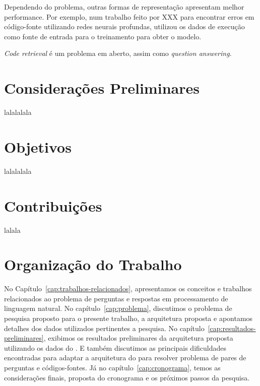 Dependendo do problema, outras formas de representação apresentam melhor performance. Por exemplo, num trabalho feito por XXX para encontrar erros em código-fonte utilizando redes neurais profundas, utilizou os dados de execução como fonte de entrada para o treinamento para obter o modelo. 

\textit{Code retrieval} é um problema em aberto, assim como \textit{question answering}. 














\section{Considerações Preliminares}
\label{sec:consideracoes_preliminares}

lalalalala


\section{Objetivos}
\label{sec:objetivo}

lalalalala

\section{Contribuições}
\label{sec:contribucoes}

lalala

\section{Organização do Trabalho}
\label{sec:organizacao_trabalho}

No Capítulo~\ref{cap:trabalhos-relacionados}, apresentamos os conceitos e trabalhos relacionados ao problema de perguntas e respostas em processamento de linguagem natural. No capítulo~\ref{cap:problema}, discutimos o problema de pesquisa proposto para o presente trabalho, a arquitetura proposta e apontamos detalhes dos dados utilizados pertinentes a pesquisa. 
No capítulo~\ref{cap:resultados-preliminares}, exibimos os resultados preliminares da arquitetura proposta utilizando os dados do \cite{yao-2018}. E também discutimos as principais dificuldades encontradas para adaptar a arquitetura do \cite{feng-2015} para resolver problema de pares de perguntas e códigos-fontes. Já no capítulo~\ref{cap:cronograma}, temos as considerações finais, proposta do cronograma e os próximos passos da pesquisa.
